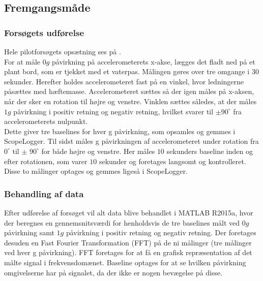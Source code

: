 \subsection{Fremgangsmåde}
\subsubsection{Forsøgets udførelse}
Hele pilotforsøgets opsætning ses på . \\
For at måle $0g$ påvirkning på accelerometerets x-akse, lægges det fladt ned på et plant bord, som er tjekket med et vaterpas. Målingen gøres over tre omgange i $30$ sekunder. Herefter holdes accelerometeret fast på en vinkel, hvor ledningerne påsættes med hæftemasse. Accelerometeret sættes så der igen måles på x-aksen, når der sker en rotation til højre og venstre. Vinklen sættes således, at der måles $1g$ påvirkning i positiv retning og negativ retning, hvilket svarer til $\pm90^{\circ}$ fra accelerometerets nulpunkt. \\
Dette giver tre baselines for hver g påvirkning, som opsamles og gemmes i ScopeLogger. %
Til sidst måles g påvirkningen af accelerometeret under rotation fra $0^{\circ}$ til $\pm$ $90^{\circ}$ for både højre og venstre. Her måles $10$ sekunders baseline inden og efter rotationen, som varer $10$ sekunder og foretages langsomt og kontrolleret. Disse to målinger optages og gemmes ligeså i ScopeLogger. \\
\subsubsection{Behandling af data}
Efter udførelse af forsøget vil alt data blive behandlet i MATLAB R2015a, hvor der beregnes en gennemsnitsværdi for henholdsvis de tre baselines målt ved $0g$ påvirkning samt $1g$ påvirkning i positiv retning og negativ retning. Der foretages desuden en Fast Fourier Transformation (FFT) på de ni målinger (tre målinger ved hver g påvirkning). FFT foretages for at få en grafisk repræsentation af det målte signal i frekvensdomænet. Baseline optages for at se hvilken påvirkning omgivelserne har på signalet, da der ikke er nogen bevægelse på disse.

